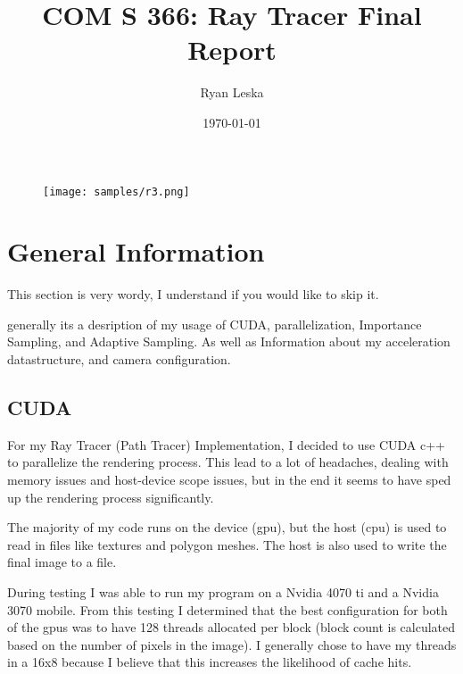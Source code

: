 \documentclass{article}
\title{COM S 366: Ray Tracer Final Report}
\author{Ryan Leska}
\date{\today}
\begin{document}
\maketitle


\begin{figure}[H]
    \centering
    \texttt{[image: samples/r3.png]}
\end{figure}

\pagebreak

\twocolumn


\tableofcontents



\section{General Information}

    This section is very wordy, I understand if you would like to skip it. \par
    generally its a desription of my usage of CUDA, parallelization, Importance Sampling, and Adaptive Sampling. As well as Information about my acceleration datastructure, and camera configuration. \par

    \subsection{CUDA}
    For my Ray Tracer (Path Tracer) Implementation, I decided to use CUDA c++ to parallelize the rendering process. This lead to a lot of headaches, dealing with memory issues and host-device scope issues, but in the end it seems to have sped up the rendering process significantly. \par

    The majority of my code runs on the device (gpu), but the host (cpu) is used to read in files like  textures and polygon meshes. The host is also used to write the final image to a file. \par  

    During testing I was able to run my program on a Nvidia 4070 ti and a Nvidia 3070 mobile. From this testing I determined that the best configuration for both of the gpus was to have 128 threads allocated per block (block count is calculated based on the number of pixels in the image). I generally chose to have my threads in a 16x8 because I believe that this increases the likelihood of cache hits. \par
\end{document}

